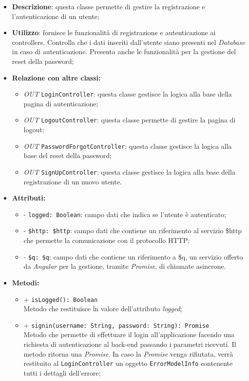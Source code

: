 \begin{itemize}
	\item \textbf{Descrizione}: questa classe permette di gestire la registrazione e l'autenticazione di un utente;
	\item \textbf{Utilizzo}: fornisce le funzionalità di registrazione e autenticazione ai controllers. Controlla che i dati inseriti dall'utente siano presenti nel \textit{Database} in caso di autenticazione. Presenta anche le funzionalità per la gestione del reset della password;
	\item \textbf{Relazione con altre classi:}
	\begin{itemize}
		\item \textit{OUT} \texttt{LoginController}: questa classe gestisce la logica alla base della pagina di autenticazione;
		\item \textit{OUT} \texttt{LogoutController}: questa classe permette di gestire la pagina di logout;
		\item \textit{OUT} \texttt{PasswordForgotController}: questa classe gestisce la logica alla base del reset della password;
		\item \textit{OUT} \texttt{SignUpController}: questa classe gestisce la logica alla base della registrazione di un nuovo utente.
	\end{itemize}
	\item \textbf{Attributi:}
	\begin{itemize}
		\item - \texttt{logged: Boolean}: campo dati che indica se l'utente è autenticato;
		\item - \texttt{\$http: \$http}: campo dati che contiene un riferimento al servizio \$http che permette la comunicazione con il protocollo HTTP;
		\item - \texttt{\$q: \$q}: campo dati che contiene un riferimento a \$q, un servizio offerto da \textit{Angular} per la gestione, tramite \textit{Promise}, di chiamate asincrone.
	\end{itemize}
	\item \textbf{Metodi:}
	\begin{itemize}
		\item + \texttt{isLogged(): Boolean} \\ Metodo che restituisce ln valore dell'attributo \textit{logged};
		\item + \texttt{signin(username: String, password: String): Promise}\\ Metodo che permette di effettuare il login all'applicazione facendo una richiesta di autenticazione al back-end passando i parametri ricevuti. Il metodo ritorna una \textit{Promise}. In caso la \textit{Promise} venga rifiutata, verrà restituito al \texttt{LoginController} un oggetto \texttt{ErrorModelInfo} contenente tutti i dettagli dell'errore; \\

\end{itemize}
\end{itemize}
